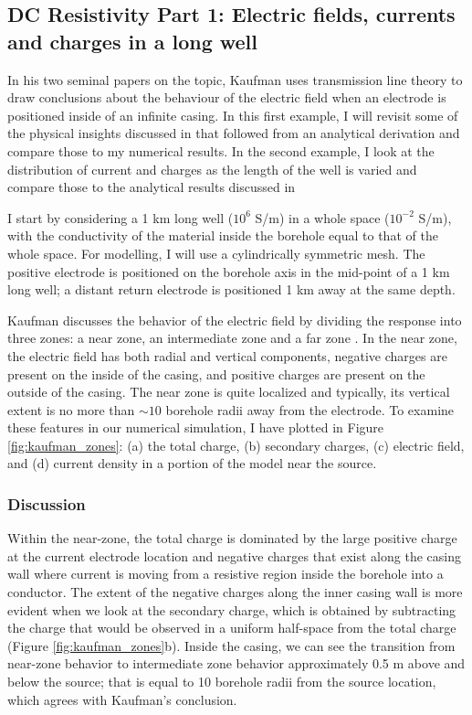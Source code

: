 \subsection{DC Resistivity Part 1: Electric fields, currents and charges in a long well}
\label{sec:dc_resistivity_part1}

In his two seminal papers on the topic, Kaufman uses transmission line theory to draw conclusions about the behaviour of the electric field when an electrode is positioned inside of an infinite casing. In this first example, I will revisit some of the physical insights discussed in \citep{Kaufman1990, Kaufman1993} that followed from an analytical derivation and compare those to my numerical results. In the second example, I look at the distribution of current and charges as the length of the well is varied and compare those to the analytical results discussed in \citep{Kaufman1993}

I start by considering a 1 km long well ($10^6$ S/m) in a whole space ($10^{-2}$ S/m), with the conductivity of the material inside the borehole equal to that of the whole space.  For modelling, I will use a cylindrically symmetric mesh. The positive electrode is positioned on the borehole axis in the mid-point of a 1 km long well;  a distant return electrode is positioned 1 km away at the same depth.

Kaufman discusses the behavior of the electric field by dividing the response into three zones: a near zone, an intermediate zone and a far zone \citep{Kaufman1990, Kaufman1993}. In the near zone, the electric field has both radial and vertical components, negative charges are present on the inside of the casing, and positive charges are present on the outside of the casing. The near zone is quite localized and typically, its vertical extent is no more than $\sim 10$ borehole radii away from the electrode. To examine these features in our numerical simulation, I have plotted in Figure \ref{fig:kaufman_zones}: (a)  the total charge, (b) secondary charges, (c) electric field, and (d) current density in a portion of the model near the source.



\subsubsection{Discussion}

Within the near-zone, the total charge is dominated by the large positive charge at the current electrode location and negative charges that exist along the casing wall where current is moving from a resistive region inside the borehole into a conductor. The extent of the negative charges along the inner casing wall is more evident when we look at the secondary charge, which is obtained by subtracting the charge that would be observed in a uniform half-space from the total charge (Figure \ref{fig:kaufman_zones}b). Inside the casing, we can see the transition from near-zone behavior to intermediate zone behavior approximately 0.5 m above and below the source; that is equal to 10 borehole radii from the source location, which agrees with Kaufman's conclusion.

